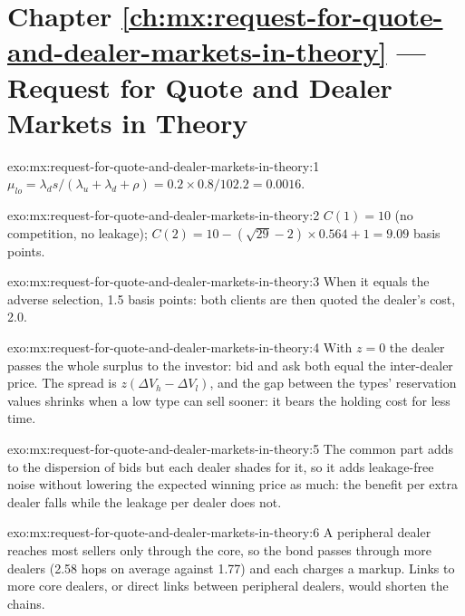 \section*{Chapter \ref{ch:mx:request-for-quote-and-dealer-markets-in-theory} --- Request for Quote and Dealer Markets in Theory}

\begin{solution}{exo:mx:request-for-quote-and-dealer-markets-in-theory:1}
$\mu_{lo}=\lambda_ds/(\lambda_u+\lambda_d+\rho)=0.2\times0.8/102.2=0.0016$.
\end{solution}

\begin{solution}{exo:mx:request-for-quote-and-dealer-markets-in-theory:2}
$C(1)=10$ (no competition, no leakage); $C(2)=10-(\sqrt{29}-2)\times0.564+1=9.09$ basis points.
\end{solution}

\begin{solution}{exo:mx:request-for-quote-and-dealer-markets-in-theory:3}
When it equals the adverse selection, 1.5 basis points: both clients are then quoted the dealer's cost, 2.0.
\end{solution}

\begin{solution}{exo:mx:request-for-quote-and-dealer-markets-in-theory:4}
With $z=0$ the dealer passes the whole surplus to the investor: bid and ask both equal the inter-dealer price. The spread is $z(\Delta V_h-\Delta V_l)$,
and the gap between the types' reservation values shrinks when a low type can sell sooner: it bears the holding cost for less time.
\end{solution}

\begin{solution}{exo:mx:request-for-quote-and-dealer-markets-in-theory:5}
The common part adds to the dispersion of bids but each dealer shades for it, so it adds leakage-free noise without lowering the expected winning
price as much: the benefit per extra dealer falls while the leakage per dealer does not.
\end{solution}

\begin{solution}{exo:mx:request-for-quote-and-dealer-markets-in-theory:6}
A peripheral dealer reaches most sellers only through the core, so the bond passes through more dealers (2.58 hops on average against 1.77) and each
charges a markup. Links to more core dealers, or direct links between peripheral dealers, would shorten the chains.
\end{solution}

